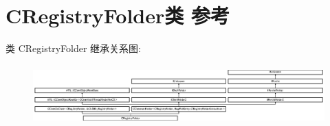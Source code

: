 \hypertarget{class_c_registry_folder}{}\section{C\+Registry\+Folder类 参考}
\label{class_c_registry_folder}
类 C\+Registry\+Folder 继承关系图\+:\begin{figure}[H]
\begin{center}
\leavevmode
\includegraphics[height=2.352941cm]{class_c_registry_folder}
\end{center}
\end{figure}
